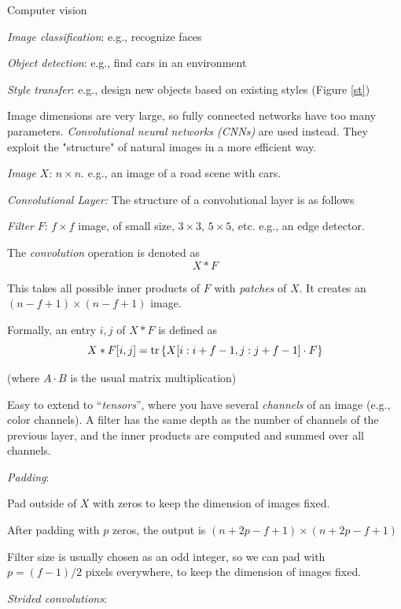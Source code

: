 \documentclass[english]{article}
\begin{document}
Computer vision
\benum
\item \emph{Image classification}: e.g., recognize faces 
\item \emph{Object detection}: e.g., find cars in an environment
\item \emph{Style transfer}: e.g., design new objects based on existing styles (Figure \ref{st})

\eenum
Image dimensions are very large, so fully connected networks have too many parameters. \emph{Convolutional neural networks (CNNs)} are used instead. They exploit the "structure" of natural images in a more efficient way. 

\item \emph{Image} $X$: $n\times n$. e.g., an image of a road scene with cars.

\item \emph{Convolutional Layer:} The structure of a convolutional layer is as follows

\benum 
\item 
\emph{Filter} $F$: $ f\times f$ image, of small size, $3 \times 3$, $5 \times 5$, etc. e.g., an edge detector.

The \emph{convolution} operation is denoted as 
$$X * F$$

This takes all possible inner products of $F$ with \emph{patches} of $X$. It creates an $(n-f+1) \times (n-f+1)$ image.

Formally, an entry $i,j$ of $X * F$ is defined as $$X * F[i,j]=\operatorname{tr} \left\{X[i:i+f-1,j:j+f-1] \cdot F \right\}$$ 

(where $A\cdot B$ is the usual matrix multiplication)

Easy to extend to ``\emph{tensors}'', where you have several \emph{channels} of an image (e.g., color channels). A filter has the same depth as the number of channels of the previous layer, and the inner products are computed and summed over all channels.

\item \emph{Padding}: 

Pad outside of $X$ with zeros to keep the dimension of images fixed. 

After padding with $p$ zeros, the output is $(n+2p-f+1) \times (n+2p-f+1)$

Filter size is usually chosen as an odd integer, so we can pad with $p = (f-1)/2$ pixels everywhere, to keep the dimension of images fixed. 

\item \emph{Strided convolutions}:
\end{document}
